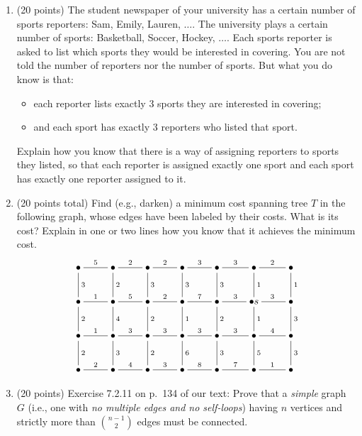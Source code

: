 \documentclass[11pt]{article}
\begin{document}
\begin{enumerate}
\pagebreak

\item (20 points) The student newspaper of your university has a certain number of sports reporters: Sam, Emily, Lauren, $\ldots$. The university plays a certain number of sports: Basketball, Soccer, Hockey, $\ldots$. Each sports reporter is asked to list which sports they would be interested in covering. You are not told the number of reporters nor the number of sports. But what you do know is that: \begin{itemize} \item each reporter lists exactly 3 sports they are interested in covering; \item and each sport has exactly 3 reporters who listed that sport. \end{itemize} Explain how you know that there is a way of assigning reporters to sports they listed, so that each reporter is assigned exactly one sport and each sport has exactly one reporter assigned to it.

\item (20 points total) Find (e.g., darken) a minimum cost spanning tree $T$ in the following graph, whose edges have been labeled by their costs. What is its cost? Explain in one or two lines how you know that it achieves the minimum cost.
\[ \xymatrix{
\bullet \ar@{-}[r]^5 \ar@{-}[d]^3 & \bullet  \ar@{-}[r]^2  \ar@{-}[d]^2 & \bullet  \ar@{-}[r]^2  \ar@{-}[d]^3 & \bullet  \ar@{-}[r]^3  \ar@{-}[d]^3 & \bullet  \ar@{-}[r]^3  \ar@{-}[d]^3 & \bullet  \ar@{-}[r]^2  \ar@{-}[d]^1 &  \ar@{-}[d]^1 \bullet \\
\bullet \ar@{-}[r]^1 \ar@{-}[d]^2 & \bullet  \ar@{-}[r]^5  \ar@{-}[d]^4 & \bullet  \ar@{-}[r]^2  \ar@{-}[d]^2 & \bullet  \ar@{-}[r]^7  \ar@{-}[d]^1 & \bullet  \ar@{-}[r]^3  \ar@{-}[d]^2 & \bullet  \ar@{-}[r]^3s  \ar@{-}[d]^1 &  \ar@{-}[d]^3 \bullet \\
\bullet \ar@{-}[r]^1 \ar@{-}[d]^2 & \bullet  \ar@{-}[r]^3  \ar@{-}[d]^3 & \bullet  \ar@{-}[r]^3  \ar@{-}[d]^2 & \bullet  \ar@{-}[r]^3  \ar@{-}[d]^6 & \bullet  \ar@{-}[r]^3  \ar@{-}[d]^3 & \bullet  \ar@{-}[r]^4  \ar@{-}[d]^5 &  \ar@{-}[d]^3 \bullet \\
\bullet \ar@{-}[r]^2 & \bullet  \ar@{-}[r]^4 & \bullet  \ar@{-}[r]^3 & \bullet  \ar@{-}[r]^8 & \bullet  \ar@{-}[r]^7 & \bullet  \ar@{-}[r]^1 & \bullet
} \]

\item (20 points) Exercise 7.2.11 on p.~134 of our text: Prove that a \emph{simple} graph $G$ (i.e., one with \emph{no multiple edges and no self-loops}) having $n$ vertices and strictly more than $\binom{n-1}{2}$ edges must be connected.

\end{enumerate}
\end{document}
